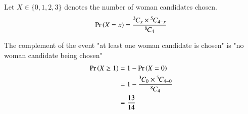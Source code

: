 Let $X \in \{0,1,2,3\}$ denotes the number of woman candidates chosen. 
\begin{align}
 \pr{X=x}=\frac{\comb{3}{x}\times \comb{5}{4-x}}{\comb{8}{4}} \label{me/2020/23/2.0.2}
  \end{align}
  
  \begin{table}[h]
\end{table}
  The complement of the event "at least one woman candidate is chosen" is "no woman candidate being chosen"
  \begin{align}
      \Pr\left(X \geq 1\right) &=1- \Pr\left(X=0\right)\\
      &=1-\frac{{{}^{3}\mkern-1muC_{0}}\times {{}^{5}\mkern-1muC_{4-0}}}{{{}^{8}\mkern-1muC_{4}}}\\
      &=\frac{13}{14}
  \end{align}